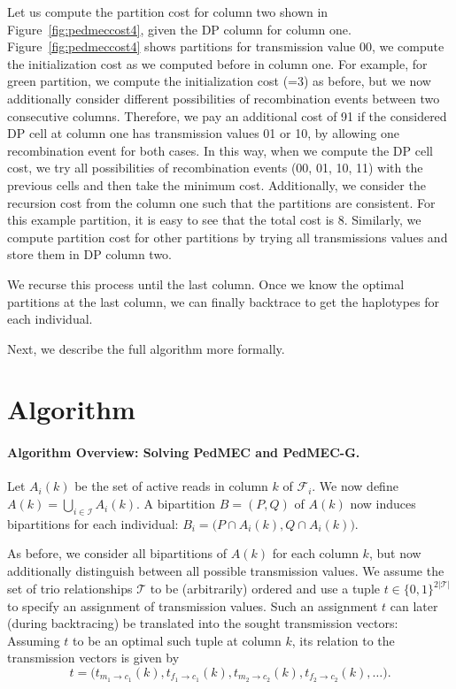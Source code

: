Let us compute the partition cost for column two shown in Figure~\ref{fig:pedmeccost4}, given the DP column for column one.
Figure~\ref{fig:pedmeccost4} shows partitions for transmission value 00, we compute the initialization cost as we computed before in column one. 
For example, for green partition, we compute the initialization cost (=3) as before, but we now additionally consider different possibilities of recombination events between two consecutive columns.
Therefore, we pay an additional cost of 91 if the considered DP cell at column one has transmission values 01 or 10, by allowing one recombination event for both cases.
In this way, when we compute the DP cell cost, we try all possibilities of recombination events (00, 01, 10, 11) with the previous cells and then take the minimum cost. 
Additionally, we consider the recursion cost from the column one such that the partitions are consistent.
For this example partition, it is easy to see that the total cost is 8.
Similarly, we compute partition cost for other partitions by trying all transmissions values and store them in DP column two.

We recurse this process until the last column. Once we know the optimal partitions at the last column, we can finally backtrace to get the haplotypes for each individual.

Next, we describe the full algorithm more formally.

\section{Algorithm}\label{sec:algorithm}
\paragraph{Algorithm Overview: Solving PedMEC and PedMEC-G.}
Let $A_i(k)$ be the set of active reads in column $k$ of $\mathcal{F}_i$.
We now define $A(k)=\bigcup_{i\in\mathcal{I}}A_i(k)$.
A bipartition $B=(P,Q)$ of $A(k)$ now induces bipartitions for each individual: $B_i=\big(P\cap A_i(k), Q\cap A_i(k)\big)$.

As before, we consider all bipartitions of $A(k)$ for each column $k$, but now additionally distinguish between all possible transmission values.
We assume the set of trio relationships $\mathcal{T}$ to be (arbitrarily) ordered and use a tuple $t\in\{0,1\}^{2|\mathcal{T}|}$ to specify an assignment of transmission values.
Such an assignment $t$ can later (during backtracing) be translated into the sought transmission vectors:
Assuming $t$ to be an optimal such tuple at column $k$, its relation to the transmission vectors is given by
\[t=\big(t_{m_1\to c_1}(k),t_{f_1\to c_1}(k),t_{m_2\to c_2}(k),t_{f_2\to c_2}(k),\ldots\big).\]

